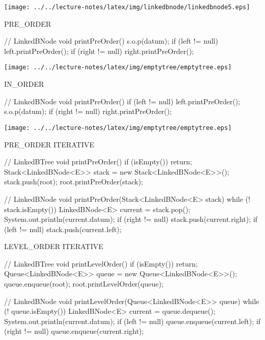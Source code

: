 \documentclass[a4paper, 10pt]{article}
\begin{document}
\begin{minipage}{0.6\linewidth}
  \begin{center}
\texttt{[image: ../../lecture-notes/latex/img/linkedbnode/linkedbnode5.eps]}
\begin{multicols}{2}
\begin{blackboard}
      PRE_ORDER

// LinkedBNode
void printPreOrder() {
  s.o.p(datum);
  if (left != null) {
    left.printPreOrder();
  }
  if (right != null) {
    right.printPreOrder();
  }
}
\end{blackboard}
\columnbreak
\texttt{[image: ../../lecture-notes/latex/img/emptytree/emptytree.eps]}
\end{multicols}
\begin{multicols}{2}
\begin{blackboard}
      IN_ORDER

// LinkedBNode
void printPreOrder() {
  if (left != null) {
    left.printPreOrder();
  }
  s.o.p(datum);
  if (right != null) {
    right.printPreOrder();
  }
}
\end{blackboard}
\columnbreak
\texttt{[image: ../../lecture-notes/latex/img/emptytree/emptytree.eps]}
\end{multicols}
\end{center}
\end{minipage}


\begin{minipage}{0.48\linewidth}
\begin{blackboard}
      PRE_ORDER ITERATIVE

// LinkedBTree
void printPreOrder() {
  if (isEmpty()) {
    return;
  }
  Stack<LinkedBNode<E>> stack =
                   new Stack<LinkedBNode<E>>();
  stack.push(root);
  root.printPreOrder(stack);
}

// LinkedBNode
void printPreOrder(Stack<LinkedBNode<E> stack) {
  while (! stack.isEmpty()) {
    LinkedBNode<E> current = stack.pop();
    System.out.println(current.datum);
    if (right != null) {
      stack.push(current.right);
    }
    if (left != null) {
      stack.push(current.left);
    }
  }
}
\end{blackboard}
\end{minipage}
\begin{minipage}{0.48\linewidth}
\begin{blackboard}
      LEVEL_ORDER ITERATIVE

// LinkedBTree
void printLevelOrder() {
  if (isEmpty()) {
    return;
  }
  Queue<LinkedBNode<E>> queue =
                   new Queue<LinkedBNode<E>>();
  queue.enqueue(root);
  root.printLevelOrder(queue);
}

// LinkedBNode
void printLevelOrder(Queue<LinkedBNode<E>> queue) {
  while (! queue.isEmpty()) {
    LinkedBNode<E> current = queue.dequeue();
    System.out.println(current.datum);
    if (left != null) {
      queue.enqueue(current.left);
    }
    if (right != null) {
      queue.enqueue(current.right);
    }
  }
}
\end{blackboard}
\end{minipage}
\end{document}
